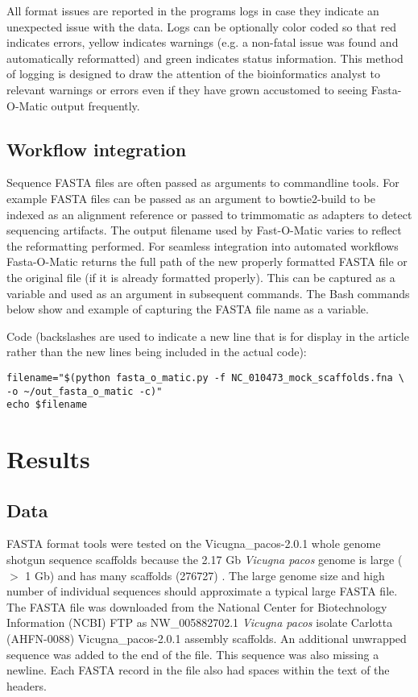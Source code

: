 \documentclass{bmcart}
\begin{document}
All format issues are reported in the programs logs in case they indicate an unexpected issue with the data. Logs can be optionally color coded so that red indicates errors, yellow indicates warnings (e.g. a non-fatal issue was found and automatically reformatted) and green indicates status information. This method of logging is designed to draw the attention of the bioinformatics analyst to relevant warnings or errors even if they have grown accustomed to seeing Fasta-O-Matic output frequently.
  
\subsection{Workflow integration}
 
Sequence FASTA files are often passed as arguments to commandline tools. For example FASTA files can be passed as an argument to bowtie2-build to be indexed as an alignment reference \cite{langmead2012fast} or passed to trimmomatic as adapters to detect sequencing artifacts. The output filename used by Fast-O-Matic varies to reflect the reformatting performed. For seamless integration into automated workflows Fasta-O-Matic returns the full path of the new properly formatted FASTA file or the original file (if it is already formatted properly). This can be captured as a variable and used as an argument in subsequent commands. The Bash commands below show and example of capturing the FASTA file name as a variable.

Code (backslashes are used to indicate a new line that is for display in the article rather than the new lines being included in the actual code):

\begin{verbatim}
filename="$(python fasta_o_matic.py -f NC_010473_mock_scaffolds.fna \
-o ~/out_fasta_o_matic -c)"
echo $filename
\end{verbatim}
  

\section{Results}

\subsection{Data}

FASTA format tools were tested on the Vicugna\_pacos-2.0.1 whole genome shotgun sequence scaffolds because the 2.17 Gb \textit{Vicugna pacos} genome is large ($>$ 1 Gb) and has many scaffolds (276727) \cite{Lindblad_Toh_2011}. The large genome size and high number of individual sequences should approximate a typical large FASTA file. The FASTA file was downloaded from the National Center for Biotechnology Information (NCBI) FTP as NW\_005882702.1 \textit{Vicugna pacos} isolate Carlotta (AHFN-0088) Vicugna\_pacos-2.0.1 assembly scaffolds.
An additional unwrapped sequence was added to the end of the file. This sequence was also missing a newline. Each FASTA record in the file also had spaces within the text of the headers.
\end{document}
